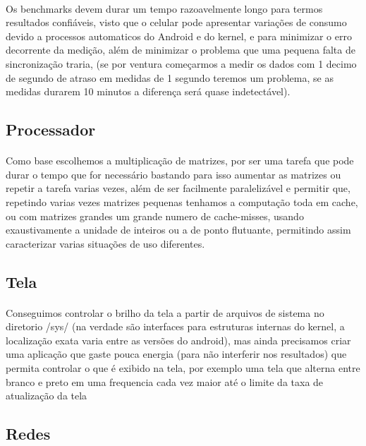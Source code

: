\documentclass[11pt,a4paper,titlepage]{article}
\begin{document}
\paragraph{} Os benchmarks devem durar um tempo razoavelmente longo para termos resultados confiáveis, visto que o celular pode apresentar variações de consumo devido a processos automaticos do Android e do kernel, e para minimizar o erro decorrente da medição, além de minimizar o problema que uma pequena falta de sincronização traria, (se por ventura começarmos a medir os dados com 1 decimo de segundo de atraso em medidas de 1 segundo teremos um problema, se as medidas durarem 10 minutos a diferença será quase indetectável).


\subsection{Processador}
\paragraph{} Como base escolhemos a multiplicação de matrizes, por ser uma tarefa que pode durar o tempo que for necessário bastando para isso aumentar as matrizes ou repetir a tarefa varias vezes, além de ser facilmente paralelizável e permitir que, repetindo varias vezes matrizes pequenas tenhamos a computação toda em cache, ou com matrizes grandes um grande numero de cache-misses, usando exaustivamente a unidade de inteiros ou a de ponto flutuante, permitindo assim caracterizar varias situações de uso diferentes.

\subsection{Tela}
\paragraph{} Conseguimos controlar o brilho da tela a partir de arquivos de sistema no diretorio /sys/ (na verdade são interfaces para estruturas internas do kernel, a localização exata varia entre as versões do android), mas ainda precisamos criar uma aplicação que gaste pouca energia (para não interferir nos resultados) que permita controlar o que é exibido na tela, por exemplo uma tela que alterna entre branco e preto em uma frequencia cada vez maior até o limite da taxa de atualização da tela 
\subsection{Redes}
\end{document}
